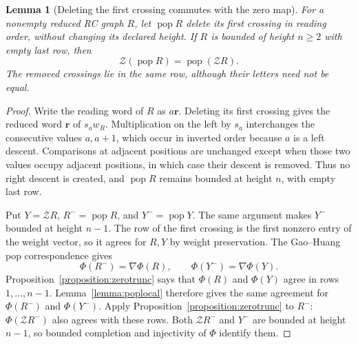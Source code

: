 \documentclass{amsart}
\newtheorem{lemma}{Lemma}[subsection]
\theoremstyle{definition}
\theoremstyle{remark}
\numberwithin{equation}{subsection}
\newcommand{\wof}[1]{w_{#1}}
\newcommand{\zeromap}{\mathcal{Z}}
\begin{document}
\begin{lemma}[Deleting the first crossing commutes with the zero map]\label{lemma:forestzeropop}
For a nonempty reduced RC graph $R$, let $\operatorname{pop}R$ delete its first crossing in reading order, without changing its declared height. If $R$ is bounded of height $n\geq2$ with empty last row, then
$$\zeromap(\operatorname{pop}R)=\operatorname{pop}(\zeromap R).$$
The removed crossings lie in the same row, although their letters need not be equal.
\end{lemma}
\begin{proof}
Write the reading word of $R$ as $a\mathbf r$. Deleting its first crossing gives the reduced word $\mathbf r$ of $s_a\wof R$. Multiplication on the left by $s_a$ interchanges the consecutive values $a,a+1$, which occur in inverted order because $a$ is a left descent. Comparisons at adjacent positions are unchanged except when those two values occupy adjacent positions, in which case their descent is removed. Thus no right descent is created, and $\operatorname{pop}R$ remains bounded at height $n$, with empty last row.

Put $Y=\zeromap R$, $R^-=\operatorname{pop}R$, and $Y^-=\operatorname{pop}Y$. The same argument makes $Y^-$ bounded at height $n-1$. The row of the first crossing is the first nonzero entry of the weight vector, so it agrees for $R,Y$ by weight preservation. The Gao--Huang pop correspondence gives
$$\Phi(R^-)=\nabla\Phi(R),\qquad \Phi(Y^-)=\nabla\Phi(Y).$$
Proposition~\ref{proposition:zerotrunc} says that $\Phi(R)$ and $\Phi(Y)$ agree in rows $1,\ldots,n-1$. Lemma~\ref{lemma:poplocal} therefore gives the same agreement for $\Phi(R^-)$ and $\Phi(Y^-)$. Apply Proposition~\ref{proposition:zerotrunc} to $R^-$: $\Phi(\zeromap R^-)$ also agrees with these rows. Both $\zeromap R^-$ and $Y^-$ are bounded at height $n-1$, so bounded completion and injectivity of $\Phi$ identify them.
\end{proof}
\end{document}
